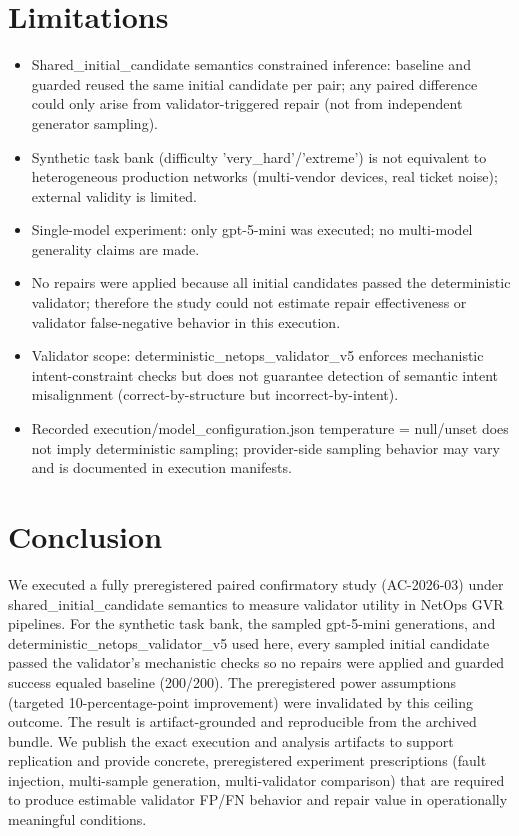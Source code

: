 \documentclass[conference]{IEEEtran}
\begin{document}
\section{Limitations}
\begin{itemize}
\item Shared\_initial\_candidate semantics constrained inference: baseline and guarded reused the same initial candidate per pair; any paired difference could only arise from validator-triggered repair (not from independent generator sampling).
\item Synthetic task bank (difficulty 'very\_hard'/'extreme') is not equivalent to heterogeneous production networks (multi-vendor devices, real ticket noise); external validity is limited.
\item Single-model experiment: only gpt-5-mini was executed; no multi-model generality claims are made.
\item No repairs were applied because all initial candidates passed the deterministic validator; therefore the study could not estimate repair effectiveness or validator false-negative behavior in this execution.
\item Validator scope: deterministic\_netops\_validator\_v5 enforces mechanistic intent-constraint checks but does not guarantee detection of semantic intent misalignment (correct-by-structure but incorrect-by-intent).
\item Recorded execution/model\_configuration.json temperature = null/unset does not imply deterministic sampling; provider-side sampling behavior may vary and is documented in execution manifests.
\end{itemize}

\section{Conclusion}
We executed a fully preregistered paired confirmatory study (AC-2026-03) under shared\_initial\_candidate semantics to measure validator utility in NetOps GVR pipelines. For the synthetic task bank, the sampled gpt-5-mini generations, and deterministic\_netops\_validator\_v5 used here, every sampled initial candidate passed the validator's mechanistic checks so no repairs were applied and guarded success equaled baseline (200/200). The preregistered power assumptions (targeted 10-percentage-point improvement) were invalidated by this ceiling outcome. The result is artifact-grounded and reproducible from the archived bundle. We publish the exact execution and analysis artifacts to support replication and provide concrete, preregistered experiment prescriptions (fault injection, multi-sample generation, multi-validator comparison) that are required to produce estimable validator FP/FN behavior and repair value in operationally meaningful conditions.
\end{document}
